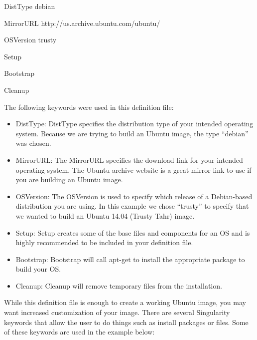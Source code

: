 \documentclass[letterpaper,10pt,english]{sphinxmanual}
\begin{document}
%
\begin{sphinxVerbatim}[commandchars=\\\{\}]
DistType \PYGZdq{}debian\PYGZdq{}

MirrorURL \PYGZdq{}http://us.archive.ubuntu.com/ubuntu/\PYGZdq{}

OSVersion \PYGZdq{}trusty\PYGZdq{}



Setup

Bootstrap



Cleanup

The following keywords were used in this definition file:
\end{sphinxVerbatim}
\begin{itemize}
\item {} 
DistType: DistType specifies the distribution type of your intended operating system. Because we are trying to build an Ubuntu image, the type “debian” was chosen.

\item {} 
MirrorURL: The MirrorURL specifies the download link for your intended operating system. The Ubuntu archive website is a great mirror link to use if you are building an Ubuntu image.

\item {} 
OSVersion: The OSVersion is used to specify which release of a Debian-based distribution you are using. In this example we chose “trusty” to specify that we wanted to build an Ubuntu
14.04 (Trusty Tahr) image.

\item {} 
Setup: Setup creates some of the base files and components for an OS and is highly recommended to be included in your definition file.

\item {} 
Bootstrap: Bootstrap will call apt-get to install the appropriate package to build your OS.

\item {} 
Cleanup: Cleanup will remove temporary files from the installation.

\end{itemize}

While this definition file is enough to create a working Ubuntu image, you may want increased customization of your image. There are several Singularity keywords that allow the user to do
things such as install packages or files. Some of these keywords are used in the example below:
\end{document}
